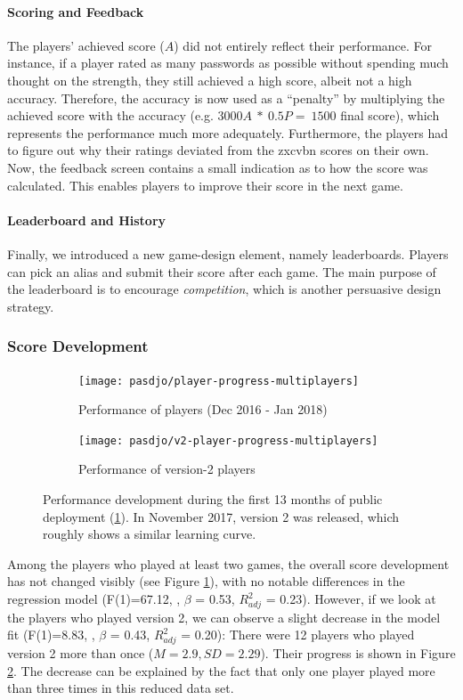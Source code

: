 \paragraph{Scoring and Feedback} The players' achieved score ($A$) did not entirely reflect their performance. For instance, if a player rated as many passwords as possible without spending much thought on the strength, they still achieved a high score, albeit not a high accuracy. Therefore, the accuracy is now used as a ``penalty'' by multiplying the achieved score with the accuracy (e.g. $3000A~*~0.5P=~1500$ final score), which represents the performance much more adequately. Furthermore, the players had to figure out why their ratings deviated from the zxcvbn scores on their own. Now, the feedback screen contains a small indication as to how the score was calculated. This enables players to improve their score in the next game. 

\paragraph{Leaderboard and History} Finally, we introduced a new game-design element, namely leaderboards. Players can pick an alias and submit their score after each game. The main purpose of the leaderboard is to encourage \textit{competition}, which is another persuasive design strategy. 

\subsubsection{Score Development}
\begin{figure}[htbp]
	\begin{subfigure}[t]{0.49\linewidth}
		\texttt{[image: pasdjo/player-progress-multiplayers]}
		\caption{\label{fig:pasdjo:1y-progress}Performance of players (Dec 2016 - Jan 2018)}
	\end{subfigure}
	\begin{subfigure}[t]{0.49\linewidth}
		\texttt{[image: pasdjo/v2-player-progress-multiplayers]}
		\caption{\label{fig:pasdjo:v2-progress}Performance of version-2 players}
	\end{subfigure}
	\caption{\label{fig:pasdjo:v2-progess-comparison} Performance development during the first 13 months of public deployment (\ref{fig:pasdjo:1y-progress}). In November 2017, version 2 was released, which roughly shows a similar learning curve.}
\end{figure}
Among the players who played at least two games, the overall score development has not changed visibly (see Figure \ref{fig:pasdjo:1y-progress}), with no notable differences in the regression model 
(F(1)=67.12, , $\beta$ = 0.53, $R^2_{adj}$ = 0.23). However, if we look at the players who played version 2, we can observe a slight decrease in the model fit (F(1)=8.83, , $\beta$ = 0.43, $R^2_{adj}$ = 0.20): There were 12 players who played version 2 more than once ($M=2.9, SD=2.29$). Their progress is shown in Figure \ref{fig:pasdjo:v2-progress}. The decrease can be explained by the fact that only one player played more than three times in this reduced data set. %


